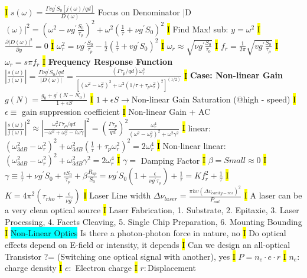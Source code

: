\documentclass[fontsize=3]{scrartcl}
\begin{document}
\hl{I}
$s(\omega) = \frac{\Gamma v g^{\prime} S_0 [j(\omega) / qd]}{D(\omega)}$
Focus on Denominator |D $(\omega)|^2 = (\omega^2 - \nu g^{\prime} \frac{S_0} {\tau_{\rho} } )^2 + \omega^2 (\frac{1}{\tau} + \nu g^{\prime} S_0)^2 $
\hl{I}
Find Max! 
sub: $y = \omega^2$
\hl{I}
$\frac{\partial |D(\omega)|^2 }{\partial y} = 0$
\hl{I}
$\omega_r^2 = \nu g^{\prime} \frac{S_0}{\tau_{p}} - \frac{1}{2} (\frac{1}{\tau} + vg^{\prime}S_0)^2$
\hl{I}
$\omega_r \approx \sqrt{\nu g^{\prime} \frac{S_0}{\tau_0}}$
\hl{I}
$f_r = \frac{1}{2\pi} \sqrt{vg^{\prime}\frac{ S_0}{ \tau_{\rho} }}$
\hl{I}
$\omega_r = s\pi f_r$
\hl{I}
\textbf{Frequency Response Function} $|\frac{s(\omega)}{j(\omega)}| = \frac{\Gamma \nu g^{\prime} S_0 / qd}{| D(\omega) |} = \frac{(\Gamma \tau_{p} / qd) \omega_r^2}{[(\omega^2 - \omega_r^2)^2 + \omega^2(1/\tau + \tau_{p} \omega^2_r)^2 ]^{(1/2)}}$
\hl{I}
\textbf{Case: Non-linear Gain}
$g(N) = \frac{g_0 + g^{\prime}(N-N_0)}{1+ \epsilon S}$ 
\hl{I}
$1+\epsilon S \rightarrow $Non-linear Gain Saturation (@high - speed)
\hl{I}
$\epsilon \equiv $ gain suppression coefficient 
\hl{I}
Non-linear Gain + AC $| \frac{ s(\omega) } { j( \omega )} |^2 \approx |\frac{ \omega_r^2 \Gamma \tau_{\rho} / qd }{-\omega^2 + \omega_r^2 - i \omega \gamma}|^2 = (\frac{\Gamma \tau_{p}}{qd})^2 \frac{\omega_r^4}{(\omega^2 - \omega_r^2)^2 + \omega^2 \gamma^2}$
\hl{I}
linear: $(\omega_{3dB}^2 - \omega_r^2)^2 + \omega_{3dB}^2 (\frac{1}{\tau} + \tau_{p} \omega_r^2)^2 = 2 \omega_r^4$
\hl{I}
Non-linear linear: $(\omega_{3dB}^{2} - \omega_{r}^2)^2 + \omega_{3dB}^2 \gamma^2 = 2\omega_r^4$
\hl{I}
$\gamma =$ Damping Factor
\hl{I}
$\beta = Small \approx 0$
\hl{I}
$\gamma \equiv \frac{1}{\tau} + \nu g^{\prime} S_0 + \frac{\epsilon S_0}{\tau_p} + \beta \frac{R_{sp}}{S_0} = \nu g^{\prime}S_0 (1 + \frac{\epsilon}{\nu g^{\prime} \tau_{\rho}}) + \frac{1}{\tau} = Kf_r^2 + \frac{1}{\tau}$
\hl{I}
$K = 4\pi^2 (\tau_{rho} + \frac{\epsilon}{\nu g^{\prime}})$
\hl{I}
Laser Line width $\Delta \nu_{laser} = \frac{\pi h v(\Delta v_{cavity - res})^2}{P_{out}}$
\hl{I}
A laser can be a very clean optical source
\hl{I}
Laser Fabrication, 1. Substrate, 2. Epitaxie, 3. Laser Processing, 4. Facets Cleaving, 5. Single Chip Preparation, 6. Mounting Bounding
\hl{I}
\colorbox{Cyan}{Non-Linear Optics}
Is there a photon-photon force in nature, no
\hl{I}
Do optical effects depend on E-field or intensity, it depends
\hl{I}
Can we design an all-optical Transistor ?= (Switching one optical signal with another), yes
\hl{I}
$P = n_e \cdot e \cdot r$
\hl{I}
$n_e: $ charge density
\hl{I}
$e: $ Electron charge
\hl{I}
$r: $Displacement
\end{document}
